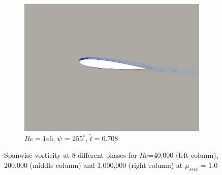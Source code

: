 \begin{figure}[H]
\begin{subfigure}[b]{0.32\textwidth}
		\includegraphics[width=1\textwidth]{figures/Vorticity_plots/Re_1m_1pt0/phase_255.png}
		\caption{$Re=1e6$, $\psi$ = $255^\circ$, $\tilde{t}=0.708$}
		\label{fig:Re_1m_1pt0_phi255}
	\end{subfigure}
	
	\caption{Spanwise vorticity at 8 different phases for $Re$=40,000 (left column), 200,000 (middle column) and 1,000,000 (right column) at $\mu_{sect}$ = 1.0}
	\label{fig:vortScreen_1pt0}
\end{figure}


